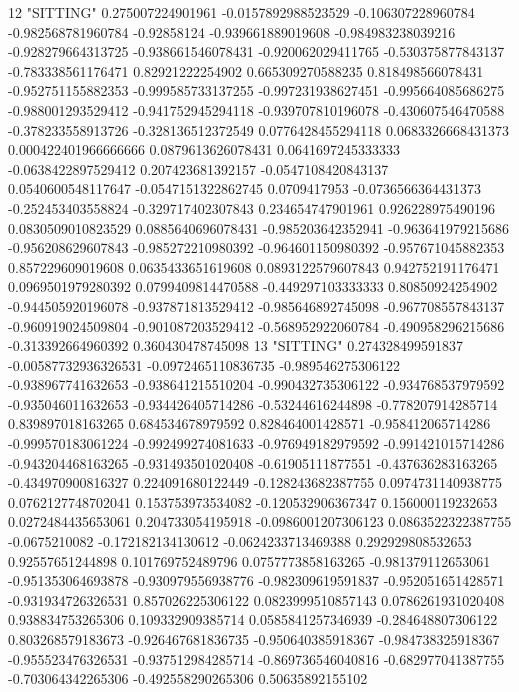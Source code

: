 12 "SITTING" 0.275007224901961 -0.0157892988523529 -0.106307228960784 -0.982568781960784 -0.92858124 -0.939661889019608 -0.984983238039216 -0.928279664313725 -0.938661546078431 -0.920062029411765 -0.530375877843137 -0.783338561176471 0.82921222254902 0.665309270588235 0.818498566078431 -0.952751155882353 -0.999585733137255 -0.997231938627451 -0.995664085686275 -0.988001293529412 -0.941752945294118 -0.939707810196078 -0.430607546470588 -0.378233558913726 -0.328136512372549 0.0776428455294118 0.0683326668431373 0.000422401966666666 0.0879613626078431 0.0641697245333333 -0.0638422897529412 0.207423681392157 -0.0547108420843137 0.0540600548117647 -0.0547151322862745 0.0709417953 -0.0736566364431373 -0.252453403558824 -0.329717402307843 0.234654747901961 0.926228975490196 0.0830509010823529 0.0885640696078431 -0.985203642352941 -0.963641979215686 -0.956208629607843 -0.985272210980392 -0.964601150980392 -0.957671045882353 0.857229609019608 0.0635433651619608 0.0893122579607843 0.942752191176471 0.0969501979280392 0.0799409814470588 -0.449297103333333 0.80850924254902 -0.944505920196078 -0.937871813529412 -0.985646892745098 -0.967708557843137 -0.960919024509804 -0.901087203529412 -0.568952922060784 -0.490958296215686 -0.313392664960392 0.360430478745098
13 "SITTING" 0.274328499591837 -0.00587732936326531 -0.0972465110836735 -0.989546275306122 -0.938967741632653 -0.938641215510204 -0.990432735306122 -0.934768537979592 -0.935046011632653 -0.934426405714286 -0.53244616244898 -0.778207914285714 0.839897018163265 0.684534678979592 0.828464001428571 -0.958412065714286 -0.999570183061224 -0.992499274081633 -0.976949182979592 -0.991421015714286 -0.943204468163265 -0.931493501020408 -0.61905111877551 -0.437636283163265 -0.434970900816327 0.224091680122449 -0.128243682387755 0.0974731140938775 0.0762127748702041 0.153753973534082 -0.120532906367347 0.156000119232653 0.0272484435653061 0.204733054195918 -0.0986001207306123 0.0863522322387755 -0.0675210082 -0.172182134130612 -0.0624233713469388 0.292929808532653 0.92557651244898 0.101769752489796 0.0757773858163265 -0.981379112653061 -0.951353064693878 -0.930979556938776 -0.982309619591837 -0.952051651428571 -0.931934726326531 0.857026225306122 0.0823999510857143 0.0786261931020408 0.938834753265306 0.109332909385714 0.0585841257346939 -0.284648807306122 0.803268579183673 -0.926467681836735 -0.950640385918367 -0.984738325918367 -0.955523476326531 -0.937512984285714 -0.869736546040816 -0.682977041387755 -0.703064342265306 -0.492558290265306 0.50635892155102
